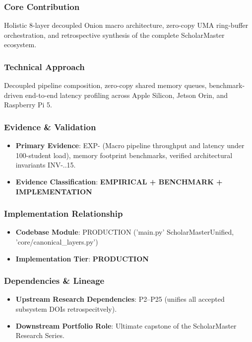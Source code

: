 \documentclass[11pt,letterpaper]{article}
\begin{document}
\subsubsection{Core Contribution}
Holistic 8-\allowbreak layer decoupled Onion macro architecture, zero-\allowbreak copy UMA ring-\allowbreak buffer orchestration, and retrospective synthesis of the complete ScholarMaster ecosystem.

\subsubsection{Technical Approach}
Decoupled pipeline composition, zero-\allowbreak copy shared memory queues, benchmark-\allowbreak driven end-\allowbreak to-\allowbreak end latency profiling across Apple Silicon, Jetson Orin, and Raspberry Pi 5.

\subsubsection{Evidence \& Validation}
\begin{itemize}[leftmargin=*]
    \item \textbf{Primary Evidence}: EXP- (Macro pipeline throughput and latency under 100-\allowbreak student load), memory footprint benchmarks, verified architectural invariants INV-..15.
    \item \textbf{Evidence Classification}: \textbf{EMPIRICAL + BENCHMARK + IMPLEMENTATION}
\end{itemize}

\subsubsection{Implementation Relationship}
\begin{itemize}[leftmargin=*]
    \item \raggedright \textbf{Codebase Module}: PRODUCTION ('main.py' ScholarMasterUnified, 'core/\allowbreak canonical\_\allowbreak layers.py')
    \item \textbf{Implementation Tier}: \textbf{PRODUCTION}
\end{itemize}

\subsubsection{Dependencies \& Lineage}
\begin{itemize}[leftmargin=*]
    \item \textbf{Upstream Research Dependencies}: P2–P25 (unifies all accepted subsystem DOIs retrospecitvely).
    \item \textbf{Downstream Portfolio Role}: Ultimate capstone of the ScholarMaster Research Series.
\end{itemize}
\end{document}
